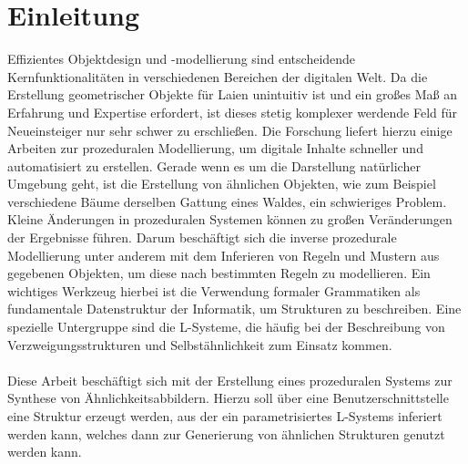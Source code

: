 
\chapter{Einleitung}
Effizientes Objektdesign und -modellierung sind entscheidende Kernfunktionalitäten in verschiedenen Bereichen der
digitalen Welt.
Da die Erstellung geometrischer Objekte für Laien unintuitiv ist und ein großes Maß an Erfahrung und Expertise
erfordert, ist dieses stetig komplexer werdende Feld für Neueinsteiger nur sehr schwer zu erschließen.
Die Forschung liefert hierzu einige Arbeiten zur prozeduralen Modellierung, um digitale Inhalte schneller
und automatisiert zu erstellen.
Gerade wenn es um die Darstellung natürlicher Umgebung geht, ist die Erstellung von ähnlichen Objekten, wie
zum Beispiel verschiedene Bäume derselben Gattung eines Waldes, ein schwieriges Problem.
Kleine Änderungen in prozeduralen Systemen können zu großen Veränderungen der Ergebnisse führen.
Darum beschäftigt sich die inverse prozedurale Modellierung unter anderem mit dem Inferieren von Regeln
und Mustern aus gegebenen Objekten, um diese nach bestimmten Regeln zu modellieren.
Ein wichtiges Werkzeug hierbei ist die Verwendung formaler Grammatiken als fundamentale Datenstruktur
der Informatik, um Strukturen zu beschreiben.
Eine spezielle Untergruppe sind die L-Systeme, die häufig bei der Beschreibung
von Verzweigungsstrukturen und Selbstähnlichkeit zum Einsatz kommen.
\\~\\
Diese Arbeit beschäftigt sich mit der Erstellung eines prozeduralen Systems zur Synthese von Ähnlichkeitsabbildern.
Hierzu soll über eine Benutzerschnittstelle eine Struktur erzeugt werden, aus der ein parametrisiertes L-Systems
inferiert werden kann, welches dann zur Generierung von ähnlichen Strukturen genutzt werden kann.

\newpage

